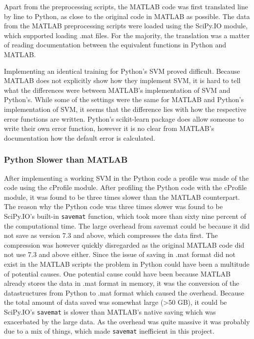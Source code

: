 \documentclass[12pt, a4paper]{article}
\begin{document}
Apart from the preprocessing scripts, the MATLAB code was first translated line by line to Python, as close to the original code in MATLAB as possible.
The data from the MATLAB preprocessing scripts were loaded using the SciPy.IO module, which supported loading .mat files.
For the majority, the translation was a matter of reading documentation between the equivalent functions in Python and MATLAB.

Implementing an identical training for Python's SVM proved difficult.
Because MATLAB does not explicitly show how they implement SVM, it is hard to tell what the differences were between MATLAB's implementation of SVM and Python's.
While some of the settings were the same for MATLAB and Python's implementation of SVM, it seems that the difference lies with how the respective error functions are written.
Python's scikit-learn package does allow someone to write their own error function, however it is no clear from MATLAB's documentation how the default error is calculated. %

\subsubsection{Python Slower than MATLAB}

After implementing a working SVM in the Python code a profile was made of the code using the cProfile module.
After profiling the Python code with the cProfile module, it was found to be three times slower than the MATLAB counterpart.
The reason why the Python code was three times slower was found to be SciPy.IO's built-in \texttt{savemat} function, which took more than sixty nine percent of the computational time.
The large overhead from savemat could be because it did not save as version 7.3 and above, which compresses the data first.
The compression was however quickly disregarded as the original MATLAB code did not use 7.3 and above either.
Since the issue of saving in .mat format did not exist in the MATLAB scripts the problem in Python could have been a multitude of potential causes.
One potential cause could have been because MATLAB already stores the data in .mat format in memory, it was the conversion of the datastructures from Python to .mat format which caused the overhead.
Because the total amount of data saved was somewhat large (>50 GB), it could be SciPy.IO's \texttt{savemat} is slower than MATLAB's native saving which was exacerbated by the large data. 
As the overhead was quite massive it was probably due to a mix of things, which made \texttt{savemat} inefficient in this project.
\end{document}
